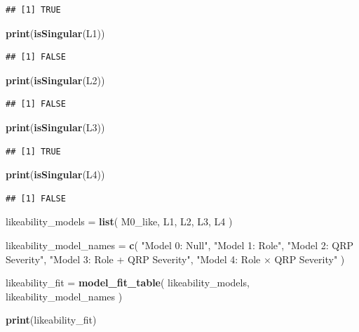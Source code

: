 \documentclass[
]{article}
\newenvironment{Shaded}{\begin{snugshade}}{\end{snugshade}}
\newcommand{\FunctionTok}[1]{\textcolor[rgb]{0.13,0.29,0.53}{\textbf{#1}}}
\newcommand{\NormalTok}[1]{#1}
\newcommand{\OtherTok}[1]{\textcolor[rgb]{0.56,0.35,0.01}{#1}}
\newcommand{\StringTok}[1]{\textcolor[rgb]{0.31,0.60,0.02}{#1}}
\begin{document}
\begin{verbatim}
## [1] TRUE
\end{verbatim}

\begin{Shaded}
\begin{Highlighting}[]
\FunctionTok{print}\NormalTok{(}\FunctionTok{isSingular}\NormalTok{(L1))}
\end{Highlighting}
\end{Shaded}

\begin{verbatim}
## [1] FALSE
\end{verbatim}

\begin{Shaded}
\begin{Highlighting}[]
\FunctionTok{print}\NormalTok{(}\FunctionTok{isSingular}\NormalTok{(L2))}
\end{Highlighting}
\end{Shaded}

\begin{verbatim}
## [1] FALSE
\end{verbatim}

\begin{Shaded}
\begin{Highlighting}[]
\FunctionTok{print}\NormalTok{(}\FunctionTok{isSingular}\NormalTok{(L3))}
\end{Highlighting}
\end{Shaded}

\begin{verbatim}
## [1] TRUE
\end{verbatim}

\begin{Shaded}
\begin{Highlighting}[]
\FunctionTok{print}\NormalTok{(}\FunctionTok{isSingular}\NormalTok{(L4))}
\end{Highlighting}
\end{Shaded}

\begin{verbatim}
## [1] FALSE
\end{verbatim}

\begin{Shaded}
\begin{Highlighting}[]
\NormalTok{likeability\_models }\OtherTok{=} \FunctionTok{list}\NormalTok{(}
\NormalTok{  M0\_like,}
\NormalTok{  L1,}
\NormalTok{  L2,}
\NormalTok{  L3,}
\NormalTok{  L4}
\NormalTok{)}

\NormalTok{likeability\_model\_names }\OtherTok{=} \FunctionTok{c}\NormalTok{(}
  \StringTok{"Model 0: Null"}\NormalTok{,}
  \StringTok{"Model 1: Role"}\NormalTok{,}
  \StringTok{"Model 2: QRP Severity"}\NormalTok{,}
  \StringTok{"Model 3: Role + QRP Severity"}\NormalTok{,}
  \StringTok{"Model 4: Role × QRP Severity"}
\NormalTok{)}

\NormalTok{likeability\_fit }\OtherTok{=} \FunctionTok{model\_fit\_table}\NormalTok{(}
\NormalTok{  likeability\_models,}
\NormalTok{  likeability\_model\_names}
\NormalTok{)}

\FunctionTok{print}\NormalTok{(likeability\_fit)}
\end{Highlighting}
\end{Shaded}
\end{document}
